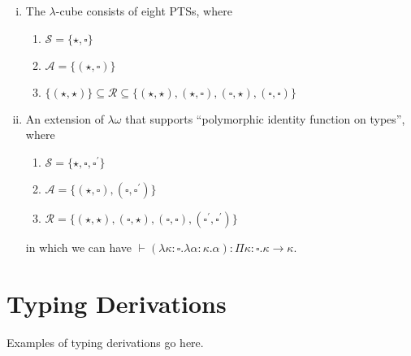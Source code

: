\documentclass[oneside,a4paper]{article}
\numberwithin{equation}{section}
\begin{document}
\begin{enumerate}[(i)]

\item The $\lambda$-cube consists of eight PTSs, where

\begin{enumerate}
\item $\mathcal{S} = \{\star,\square\}$
\item $\mathcal{A} = \{(\star, \square)\}$
\item $\{(\star, \star)\} \subseteq \mathcal{R} \subseteq \{(\star, \star), (\star, \square), (\square, \star), (\square, \square)\}$
\end{enumerate}

\item An extension of $\lambda\omega$ that supports ``polymorphic identity function on types'', where

\begin{enumerate}
\item $\mathcal{S} = \{\star,\square, \square^{\prime}\}$
\item $\mathcal{A} = \{(\star, \square), (\square, \square^{\prime})\}$
\item $\mathcal{R} = \{(\star, \star), (\square, \star), (\square, \square), (\square^{\prime}, \square^{\prime})\}$
\end{enumerate}

in which we can have $\vdash (\lambda \kappa : \square.\lambda \alpha : \kappa. \alpha) : \Pi \kappa : \square . \kappa \rightarrow \kappa$.


\end{enumerate}

\section{Typing Derivations}

Examples of typing derivations go here.


\nocite{*}


\end{document}
